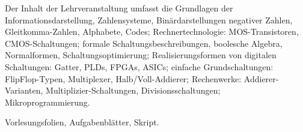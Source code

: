 \begin{course}
\begin{content}
Der Inhalt der Lehrveranstaltung umfasst die Grundlagen der Informationsdarstellung, Zahlensysteme, Binärdarstellungen negativer Zahlen, Gleitkomma-Zahlen, Alphabete, Codes; Rechnertechnologie: MOS-Transistoren, CMOS-Schaltungen; formale Schaltungsbeschreibungen, boolesche Algebra, Normalformen, Schaltungsoptimierung; Realisierungsformen von digitalen Schaltungen: Gatter, PLDs, FPGAs, ASICs; einfache Grundschaltungen: FlipFlop-Typen, Multiplexer, Halb/Voll-Addierer; Rechenwerke: Addierer-Varianten, Multiplizier-Schaltungen, Divisionsschaltungen; Mikroprogrammierung.


\end{content}

\begin{media}Vorlesungsfolien, Aufgabenblätter, Skript.

\end{media}





\end{course}